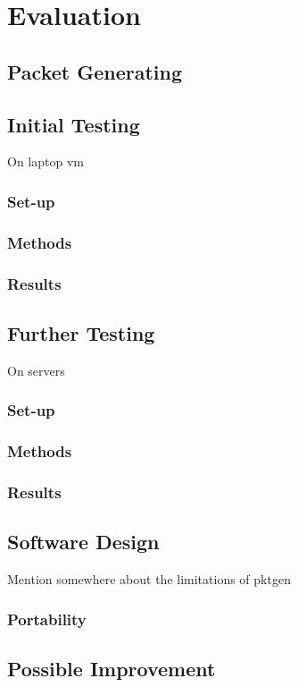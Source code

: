\documentclass[final_report.tex]{subfiles}
\begin{document}
\section{Evaluation}

\subsection{Packet Generating}

\subsection{Initial Testing}
On laptop vm

\subsubsection{Set-up}

\subsubsection{Methods}

\subsubsection{Results}

\subsection{Further Testing}
On servers

\subsubsection{Set-up}

\subsubsection{Methods}

\subsubsection{Results}

\subsection{Software Design}
Mention somewhere about the limitations of pktgen

\subsubsection{Portability}

\subsection{Possible Improvement}
\end{document}
